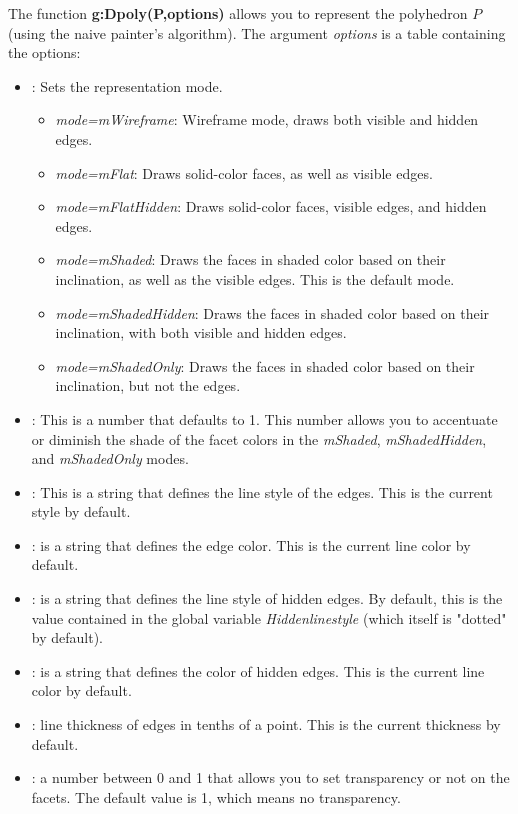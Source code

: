 The function \textbf{g:Dpoly(P,options)} allows you to represent the polyhedron $P$ (using the naive painter's algorithm). The argument \emph{options} is a table containing the options:
\begin{itemize}
    \item {}: Sets the representation mode.
\begin{itemize}
    \item \emph{mode=mWireframe}: Wireframe mode, draws both visible and hidden edges.
    \item \emph{mode=mFlat}: Draws solid-color faces, as well as visible edges.
    \item \emph{mode=mFlatHidden}: Draws solid-color faces, visible edges, and hidden edges.
    \item \emph{mode=mShaded}: Draws the faces in shaded color based on their inclination, as well as the visible edges. This is the default mode.
    \item \emph{mode=mShadedHidden}: Draws the faces in shaded color based on their inclination, with both visible and hidden edges.
    \item \emph{mode=mShadedOnly}: Draws the faces in shaded color based on their inclination, but not the edges.
\end{itemize}
    \item {}: This is a number that defaults to 1. This number allows you to accentuate or diminish the shade of the facet colors in the \emph{mShaded}, \emph{mShadedHidden}, and \emph{mShadedOnly} modes.
    \item {}: This is a string that defines the line style of the edges. This is the current style by default.
    \item {} : is a string that defines the edge color. This is the current line color by default.
    \item {} : is a string that defines the line style of hidden edges. By default, this is the value contained in the global variable \emph{Hiddenlinestyle} (which itself is "dotted" by default).
    \item {} : is a string that defines the color of hidden edges. This is the current line color by default.
    \item {} : line thickness of edges in tenths of a point. This is the current thickness by default.
    \item {} : a number between 0 and 1 that allows you to set transparency or not on the facets. The default value is 1, which means no transparency.

\end{itemize}
